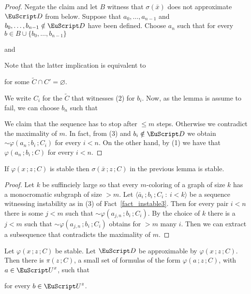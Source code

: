 \begin{proof}
  Negate the claim and let $B$ witness that $\sigma(\bar x)$ does not approximate ${\EuScript D}$ from below.
  Suppose that $a_0,\dots,a_{n-1}$ and $b_0,\dots,b_{n-1}\notin{\EuScript D}$ have been defined.
  Choose $a_n$ such that for every $b\in B\cup\{b_0,\dots,b_{n-1}\}$

  \quad and

  
  Note that the latter implication is equivalent to 
  
  \hfill for some $\tilde C\cap C'=\varnothing$.

  We write $C_i$ for the $\tilde C$ that witnesses (2) for $b_i$.
  Now, as the lemma is assume to fail, we can choose $b_n$ such that


  We claim that the sequence has to stop after $\le m$ steps. 
  Otherwise we contradict the maximality of $m$.
  In fact, from (3) and $b_i\notin{\EuScript D}$ we obtain ${\sim}\varphi(a_n\,;b_i\,;C_i)$ for every $i<n$.
  On the other hand, by (1) we have that $\varphi(a_n\,;b_i\,;C)$ for every $i<n$.
\end{proof}

\begin{lemma}
  If $\varphi(x\,;z\,;C)$ is stable then $\sigma(\bar x\,;z\,;C)$ in the previous lemma is stable.
\end{lemma}

\begin{proof}
  Let $k$ be suffinciely large so that every $m$-coloring of a graph of size $k$ has a monocromatic subgraph of size $>m$.
  Let $\langle \bar a_i\,;b_i\,;C_i\ :\ i<k\rangle$ be a sequence witnessing instability as in (3) of Fact~\ref{fact_instable3}.
  Then for every pair $i<n$ there is some $j<m$ such that ${\sim}\varphi(a_{j,n}\,;b_i\,;C_i)$.
  By the choice of $k$ there is a $j<m$ such that ${\sim}\varphi(a_{j,n}\,;b_i\,;C_i)$ obtains for $>m$ many $i$.
  Then we can extract a subsequence that contradicts the maximality of $m$.
\end{proof}

\begin{theorem}[ (conjecture)]\label{thm_stable_definable}
  Let $\varphi(x\,;z\,;C)$ be stable.
  Let ${\EuScript D}$ be approximable by $\varphi(x\,;z\,;C)$.
  Then there is $\pi(z\,;C)$, a small set of formulas of the form $\varphi(a\,;z\,;C)$, with $a\in{\EuScript U}^x$, such that

  \hfill for every $b\in{\EuScript U}^z$.
\end{theorem}




